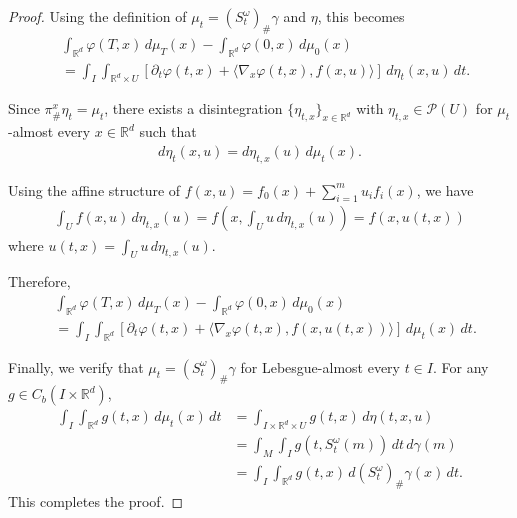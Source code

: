 \documentclass{article}
\begin{document}
\begin{proof}
Using the definition of $\mu_t = (S^\omega_t)_{\#}\gamma$ and $\eta$, this becomes
\begin{align}
&\int_{\mathbb{R}^d} \varphi(T,x) \, d\mu_T(x) - \int_{\mathbb{R}^d} \varphi(0,x) \, d\mu_0(x) \\
&= \int_{I} \int_{\mathbb{R}^d \times U} [\partial_t \varphi(t,x) + \langle \nabla_x \varphi(t,x), f(x,u) \rangle] \, d\eta_t(x,u) \, dt.
\end{align}

Since $\pi^x_{\#}\eta_t = \mu_t$, there exists a disintegration $\{\eta_{t,x}\}_{x \in \mathbb{R}^d}$ with $\eta_{t,x} \in \mathcal{P}(U)$ for $\mu_t$-almost every $x \in \mathbb{R}^d$ such that
\begin{align}
d\eta_t(x,u) = d\eta_{t,x}(u) \, d\mu_t(x).
\end{align}

Using the affine structure of $f(x,u) = f_0(x) + \sum_{i=1}^m u_i f_i(x)$, we have
\begin{align}
\int_{U} f(x,u) \, d\eta_{t,x}(u) = f\left(x, \int_{U} u \, d\eta_{t,x}(u)\right) = f(x,u(t,x))
\end{align}
where $u(t,x) = \int_{U} u \, d\eta_{t,x}(u)$.

Therefore,
\begin{align}
&\int_{\mathbb{R}^d} \varphi(T,x) \, d\mu_T(x) - \int_{\mathbb{R}^d} \varphi(0,x) \, d\mu_0(x) \\
&= \int_{I} \int_{\mathbb{R}^d} [\partial_t \varphi(t,x) + \langle \nabla_x \varphi(t,x), f(x,u(t,x)) \rangle] \, d\mu_t(x) \, dt.
\end{align}

Finally, we verify that $\mu_t = (S^\omega_t)_{\#}\gamma$ for Lebesgue-almost every $t \in I$. For any $g \in C_b(I \times \mathbb{R}^d)$,
\begin{align}
\int_{I} \int_{\mathbb{R}^d} g(t,x) \, d\mu_t(x) \, dt &= \int_{I \times \mathbb{R}^d \times U} g(t,x) \, d\eta(t,x,u) \\
&= \int_{M} \int_{I} g(t,S^\omega_t(m)) \, dt \, d\gamma(m) \\
&= \int_{I} \int_{\mathbb{R}^d} g(t,x) \, d(S^\omega_t)_{\#}\gamma(x) \, dt.
\end{align}
This completes the proof.
\end{proof}
\end{document}
